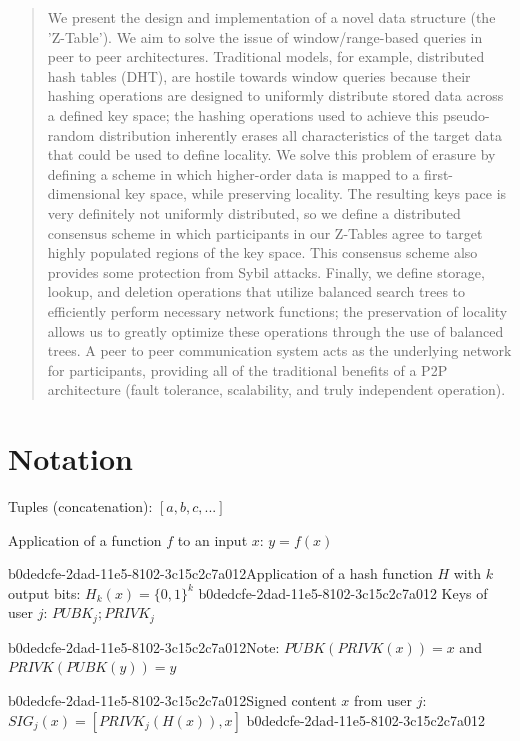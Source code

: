\documentclass[12pt]{article}
\begin{document}
\maketitle

\begin{abstract}
We present the design and implementation of a novel data structure (the 'Z-Table'). We aim to solve the issue of window/range-based queries in peer to peer architectures. Traditional models, for example,  distributed hash tables (DHT), are hostile towards window queries because their hashing operations are designed to uniformly distribute stored data across a defined key space; the hashing operations used to achieve this pseudo-random distribution inherently erases all characteristics of the target data that could be used to define locality. We solve this problem of erasure by defining a scheme in which higher-order data is mapped to a first-dimensional key space, while preserving locality. The resulting keys pace is very definitely not uniformly distributed, so we define a distributed consensus scheme in which participants in our Z-Tables agree to target highly populated regions of the key space. This consensus scheme also provides some protection from Sybil attacks. Finally, we define storage, lookup, and deletion operations that utilize balanced search trees to efficiently perform necessary network functions; the preservation of locality allows us to greatly optimize these operations through the use of balanced trees. A peer to peer communication system acts as the underlying network for participants, providing all of the traditional benefits of a P2P architecture (fault tolerance, scalability, and truly independent operation).
\end{abstract}

\section{Notation}

Tuples (concatenation): $[a,b,c,...]$

Application of a function $f$ to an input $x$: $y=f(x)$

b0dedcfe-2dad-11e5-8102-3c15c2c7a012Application of a hash function $H$ with $k$ output bits: $H_{k}(x) = \{0,1\}^k$
b0dedcfe-2dad-11e5-8102-3c15c2c7a012
Keys of user $j$: $ PUBK_j; PRIVK_j $

b0dedcfe-2dad-11e5-8102-3c15c2c7a012Note: $PUBK(PRIVK(x)) = x$ and $PRIVK(PUBK(y)) = y$~

b0dedcfe-2dad-11e5-8102-3c15c2c7a012Signed content $x$ from user $j$: $SIG_j(x) = \left[ PRIVK_j( H(x) ), x \right]$
b0dedcfe-2dad-11e5-8102-3c15c2c7a012
\end{document}
